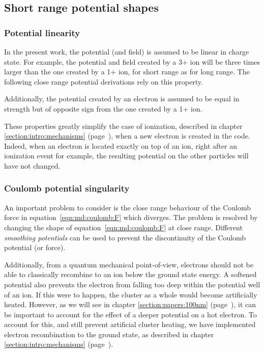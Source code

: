 \subsection{Short range potential shapes}
\label{section:intro:md:potentials}

\subsubsection{Potential linearity}
\label{section:intro:md:potentials:linear}

In the present work, the potential (and field) is assumed to be linear in
charge state. For example, the potential and field created by a 3+ ion will be
three times larger than the one created by a 1+ ion, for short range as for
long range. The following close range potential derivations rely on this
property.

Additionally, the potential created by an electron is assumed to be equal in
strength but of opposite sign from the one created by a 1+ ion.

These properties greatly simplify the case of ionization, described in chapter
\ref{section:intro:mechanisms} (page~\pageref{section:intro:mechanisms}),
when a new electron is created in the code.
Indeed, when an electron is located exactly on top of an ion, right after
an ionization event for example, the resulting potential on the other particles
will have not changed.


\subsubsection{Coulomb potential singularity}
\label{section:intro:md:potentials:singularity}

An important problem to consider is the close range behaviour of the Coulomb force
in equation~\eqref{eqn:md:coulomb:F} which diverges. The problem is resolved by
changing the shape of equation~\eqref{eqn:md:coulomb:F} at close range.
Different \textit{smoothing potentials} can be used to prevent the
discontinuity of the Coulomb potential (or force).

Additionally, from a quantum mechanical point-of-view, electrons should not be
able to classically recombine to an ion below the ground state energy.
A softened potential also prevents the electron from falling too deep within the
potential well of an ion. If this were to happen, the cluster as a whole would
become artificially heated. However, as we will see in chapter
\ref{section:papers:100nm} (page~\pageref{section:papers:100nm}), it can be
important to account for the effect of a deeper potential on a hot electron. To
account for this, and still prevent artificial cluster heating, we have
implemented electron recombination to the ground state, as described in chapter
\ref{section:intro:mechanisms} (page~\pageref{section:intro:mechanisms}).

